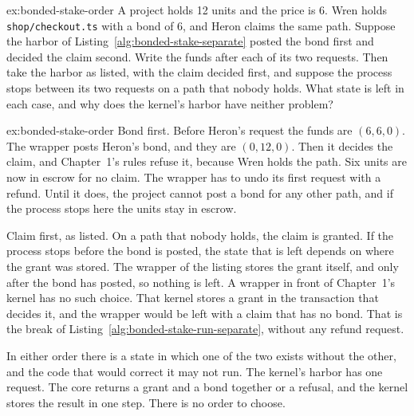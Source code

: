 \documentclass[11pt,a4paper]{article}
\theoremstyle{definition}
\theoremstyle{remark}
\begin{document}
\begin{pdexercise}[kind=Trace,rating=2]{ex:bonded-stake-order}
A project holds 12 units and the price is 6. Wren holds \texttt{shop/checkout.ts} with a bond of 6, and Heron claims the same path. Suppose the harbor of Listing~\ref{alg:bonded-stake-separate} posted the bond first and decided the claim second. Write the funds after each of its two requests. Then take the harbor as listed, with the claim decided first, and suppose the process stops between its two requests on a path that nobody holds. What state is left in each case, and why does the kernel's harbor have neither problem?
\end{pdexercise}
\begin{pdsolution}{ex:bonded-stake-order}
Bond first. Before Heron's request the funds are $(6,6,0)$. The wrapper posts Heron's bond, and they are $(0,12,0)$. Then it decides the claim, and Chapter~1's rules refuse it, because Wren holds the path. Six units are now in escrow for no claim. The wrapper has to undo its first request with a refund. Until it does, the project cannot post a bond for any other path, and if the process stops here the units stay in escrow.

Claim first, as listed. On a path that nobody holds, the claim is granted. If the process stops before the bond is posted, the state that is left depends on where the grant was stored. The wrapper of the listing stores the grant itself, and only after the bond has posted, so nothing is left. A wrapper in front of Chapter~1's kernel has no such choice. That kernel stores a grant in the transaction that decides it, and the wrapper would be left with a claim that has no bond. That is the break of Listing~\ref{alg:bonded-stake-run-separate}, without any refund request.

In either order there is a state in which one of the two exists without the other, and the code that would correct it may not run. The kernel's harbor has one request. The core returns a grant and a bond together or a refusal, and the kernel stores the result in one step. There is no order to choose.
\end{pdsolution}
\end{document}
